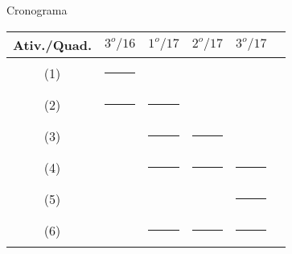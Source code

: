 \documentclass[25pt,landscape]{beamer}
\begin{document}
\begin{frame}{Cronograma}
    \begin{table}[H]
		\begin{center}
			\begin{tabular}{|c|c|c|c|c|c|} 
				\hline
				\rule[-2mm]{0mm}{6mm}
				Ativ./Quad. & $3^o/16$ & $1^o/17$ & $2^o/17$ & $3^o/17$ \\
				\hline
				\rule[-2mm]{0mm}{6mm}
				(1) & \rule[0mm]{10mm}{2mm} &   &  &    \\
				\rule[-1mm]{0mm}{5mm}
				(2) & \rule[0mm]{10mm}{2mm} & \rule[0mm]{10mm}{2mm} &  &    \\
				\rule[-1mm]{0mm}{5mm}
				(3) &  & \rule[0mm]{10mm}{2mm} & \rule[0mm]{10mm}{2mm} &     \\
				\rule[-1mm]{0mm}{5mm}
				(4) &   & \rule[0mm]{10mm}{2mm} & \rule[0mm]{10mm}{2mm} & \rule[0mm]{10mm}{2mm}    \\
				\rule[-1mm]{0mm}{5mm}
				(5) &   &  &  &  \rule[0mm]{10mm}{2mm}   \\
				\rule[-1mm]{0mm}{5mm}
				(6) &   & \rule[0mm]{10mm}{2mm} & \rule[0mm]{10mm}{2mm}  &  \rule[0mm]{10mm}{2mm}  \\
				\hline
			\end{tabular}
		\end{center}
	\end{table}
\end{frame}

\end{document}

